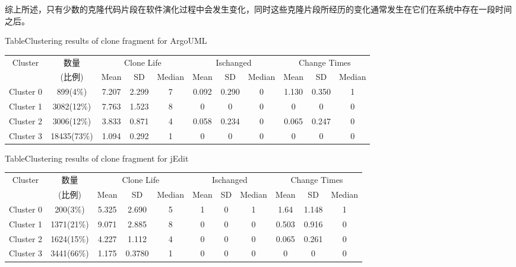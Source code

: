 综上所述，只有少数的克隆代码片段在软件演化过程中会发生变化，同时这些克隆片段所经历的变化通常发生在它们在系统中存在一段时间之后。

\begin{table}[htbp]
{Table$\!$}{Clustering results of clone fragment for ArgoUML}
\vspace{0.5em}
\centering
\footnotesize
\begin{tabular}{ccccccccccc}
\toprule[1.5pt]
\multirow{2}{*}{Cluster}&{数量}&\multicolumn{3}{c}{Clone Life}&\multicolumn{3}{c}{Ischanged}&\multicolumn{3}{c}{Change Times} \\
\cline{3-11}
&(比例)&{Mean}&SD &{Median}&{Mean}&SD &{Median}&{Mean}&SD &{Median}\\
\midrule[1pt]
Cluster 0&899(4\%)&7.207&2.299&7&0.092&0.290&0&1.130&0.350&1\\ 
Cluster 1&3082(12\%)&7.763&1.523&8&0&0&0	&0&0&0\\ 
Cluster 2&3006(12\%)&3.833&0.871&4&0.058&0.234&0	&0.065&0.247&0\\ 
Cluster 3&18435(73\%)&1.094&0.292&1	&0	&0	&0	&0	&0	&0\\ 
\bottomrule[1.5pt]
\end{tabular}
\end{table}

\begin{table}[htbp]
{Table$\!$}{Clustering results of clone fragment for jEdit}
\vspace{0.5em}
\centering
\footnotesize
\begin{tabular}{ccccccccccc}
\toprule[1.5pt]
\multirow{2}{*}{Cluster}&{数量}&\multicolumn{3}{c}{Clone Life}&\multicolumn{3}{c}{Ischanged}&\multicolumn{3}{c}{Change Times} \\
\cline{3-11}
&(比例)&{Mean}&SD &{Median}&{Mean}&SD&{Median}&{Mean}&SD &{Median}\\
\midrule[1pt]
Cluster 0&200(3\%)&5.325&2.690&5&1	&0	&1	&1.64	&1.148&1\\ 
Cluster 1&1371(21\%)	&9.071&2.885&8	&0	&0	&0	&0.503&0.916&0\\ 
Cluster 2&	1624(15\%)	&4.227&1.112&4	&0	&0	&0	&0.065&0.261&0\\ 
Cluster 3&	3441(66\%)	&1.175	&0.3780&1	&0	&0	&0	&0	&0	&0\\ 
\bottomrule[1.5pt]
\end{tabular}
\end{table}

